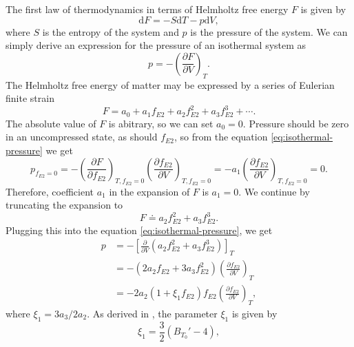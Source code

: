The first law of thermodynamics in terms of Helmholtz free energy $F$ is
given by
\begin{equation}
  \mathrm{d}F = - S \mathrm{d}T - p \mathrm{d}V,
\end{equation}
where $S$ is the entropy of the system and $p$ is the pressure of the system.
We can simply derive an expression for the pressure of an isothermal system as
\begin{equation}
  p = - \left(\frac{\partial F}{\partial V}\right)_T.
  \label{eq:isothermal-pressure}
\end{equation}
The Helmholtz free energy of matter may be expressed by a series of Eulerian
finite strain
\begin{equation}
  F = a_0 + a_1 f_{E2} + a_2 f_{E2}^2 + a_3 f_{E2}^3 + \cdots.
\end{equation}
The absolute value of $F$ is abitrary, so we can set $a_0 = 0$. Pressure
should be zero in an uncompressed state, as should $f_{E2}$, so from the
equation \eqref{eq:isothermal-pressure} we get
\begin{equation}
  p_{f_{E2}=0} = - \left(
    \frac{\partial F}{\partial f_{E2}}
  \right)_{T,f_{E2}=0} \left(
    \frac{\partial f_{E2}}{\partial V}
  \right)_{T, f_{E2}=0} = -a_1 \left(
    \frac{\partial f_{E2}}{\partial V}
  \right)_{T, f_{E2}=0} = 0.
\end{equation}
Therefore, coefficient $a_1$ in the expansion of $F$ is $a_1 = 0$. We continue
by truncating the expansion to
\begin{equation}
  F \doteq a_2 f_{E2}^2 + a_3 f_{E2}^3.
\end{equation}
Plugging this into the equation \eqref{eq:isothermal-pressure}, we get
\begin{equation}
\begin{alignedat}{2}
  p &= -\left[
    \frac{\partial}{\partial V}(a_2 f_{E2}^2 + a_3 f_{E2}^3)
  \right]_T \\
  &= - (2 a_2 f_{E2} + 3 a_3 f_{E2}^2)
  \left( \frac{\partial f_{E2}}{\partial V}\right)_T \\
  &= -2 a_2 (1 + \xi_1 f_{E2}) f_{E2} \left(
    \frac{\partial f_{E2}}{\partial V}
  \right)_T,
  \label{eq:pressure}
\end{alignedat}
\end{equation}
where $\xi_1 = 3 a_3/2 a_2$. As derived in \cite{min9120745}, the parameter
$\xi_1$ is given by
\begin{equation}
  \xi_1 = \frac{3}{2}\left(B_{T_0}' - 4\right),
  \label{eqn:xi_1}
\end{equation}
